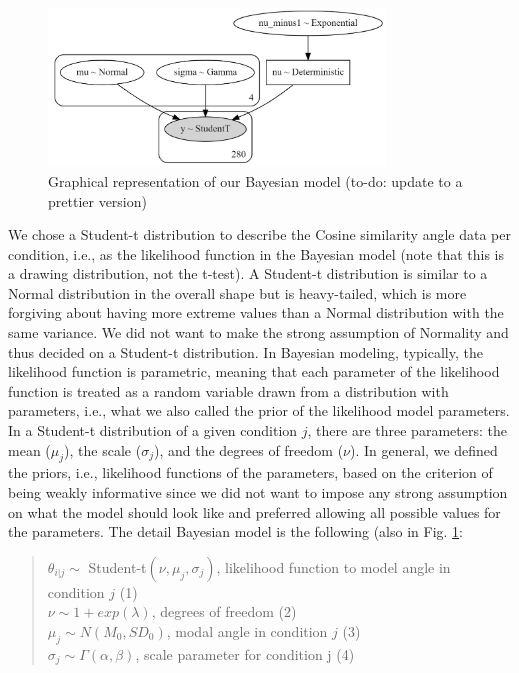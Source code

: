 \begin{figure}[htpb]
    \centering
    \includegraphics[width=0.8\textwidth, keepaspectratio=true]{content/image/model_graph.png}
    \caption{
      Graphical representation of our Bayesian model (to-do: update to a prettier version)
    }
    \label{fig:bayesian_model_exp1}
\end{figure}

We chose a Student-t distribution to describe the Cosine similarity angle data per condition, i.e., as the likelihood function in the Bayesian model (note that this is a drawing distribution, not the t-test). A Student-t distribution is similar to a Normal distribution in the overall shape but is heavy-tailed, which is more forgiving about having more extreme values than a Normal distribution with the same variance. We did not want to make the strong assumption of Normality and thus decided on a Student-t distribution. In Bayesian modeling, typically, the likelihood function is parametric, meaning that each parameter of the likelihood function is treated as a random variable drawn from a distribution with parameters, i.e., what we also called the prior of the likelihood model parameters. In a Student-t distribution of a given condition $j$, there are three parameters: the mean ($\mu_j$), the scale ($\sigma_j$), and the degrees of freedom ($\nu$). In general, we defined the priors, i.e., likelihood functions of the parameters, based on the criterion of being weakly informative since we did not want to impose any strong assumption on what the model should look like and preferred allowing all possible values for the parameters. The detail Bayesian model is the following (also in Fig. \ref{fig:bayesian_model_exp1}:

\begin{quote}
    $\theta_{i|j} \sim$ Student-t$(\nu, \mu_j, \sigma_j)$, \hfill likelihood function to model angle in condition $j$ (1) \\
    $\nu \sim 1 + exp(\lambda)$, \hfill degrees of freedom (2) \\
    $\mu_j \sim N(M_0, SD_0)$, \hfill modal angle in condition $j$ (3) \\
    $\sigma_j \sim \Gamma(\alpha, \beta)$, \hfill scale parameter for condition j (4)
\end{quote}

